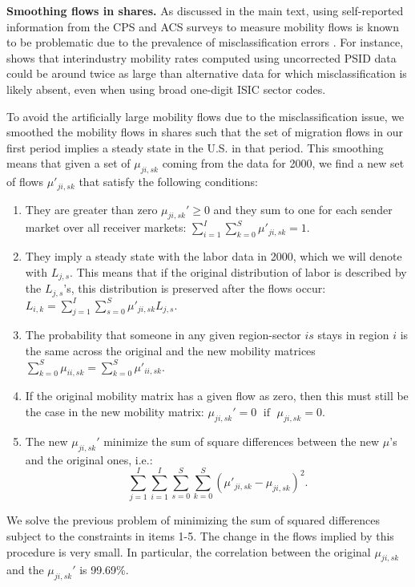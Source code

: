 \documentclass[12pt]{article}
\newcommand{\be}{\small \begin{enumerate}}
\newcommand{\ee}{\end{enumerate}}
\begin{document}
\textbf{Smoothing flows in shares.} As discussed in the main text, using self-reported information from the CPS and ACS surveys to measure mobility flows is known to be problematic due to the prevalence of misclassification errors \citep{murphy1987unemployment,kambourov2008rising,kambourov2013cautionary,Dvorkin2021}. For instance, \cite{Dvorkin2021} shows that interindustry mobility rates computed using uncorrected PSID data could be around twice as large than alternative data for which misclassification is likely absent, even when using broad one-digit ISIC sector codes.  

To avoid the artificially large mobility flows due to the misclassification issue, we smoothed the mobility flows in shares such that the set of migration flows in our first period implies a steady state in the U.S. in that period. This smoothing means that given a set of $\mu_{ji,sk}$ coming from the data for 2000, we find a new set of flows $\mu'_{ji,sk}$ that satisfy the following conditions: 
\be
\item They are greater than zero $ \mu_{ji,sk}' \geq 0$ and they sum to one for each sender market over all receiver markets: $\sum_{i=1}^I \sum_{k=0}^S \mu'_{ji,sk} = 1$.
\item They imply a steady state with the labor data in 2000, which we will denote with $L_{j,s}$. This means that if the original distribution of labor is described by the $L_{j,s}$'s, this distribution is preserved after the flows occur: $L_{i,k}= \sum_{j=1}^I \sum_{s=0}^S \mu'_{ji,sk} L_{j,s}$.
\item The probability that someone in any given region-sector $is$ stays in region $i$ is the same across the original and the new mobility matrices $ \sum_{k=0}^S \mu_{ii,sk} = \sum_{k=0}^S \mu'_{ii,sk} $.
\item If the original mobility matrix has a given flow as zero, then this must still be the case in the new mobility matrix: $ \mu_{ji,sk}'=0 \; \text{ if } \; \mu_{ji,sk}=0 $.
\item The new $\mu_{ji,sk}'$ minimize the sum of square differences between the new $\mu$'s and the original ones, i.e.:
$$\sum_{j=1}^{I} \sum_{i=1}^{I} \sum_{s=0}^{S} \sum_{k=0}^{S} (\mu'_{ji,sk}-\mu_{ji,sk})^2.$$
\ee
We solve the previous problem of minimizing the sum of squared differences subject to the constraints in items 1-5. The change in the flows implied by this procedure is very small. In particular, the correlation between the original $\mu_{ji,sk}$ and the $\mu_{ji,sk}'$ is 99.69\%.
\end{document}
